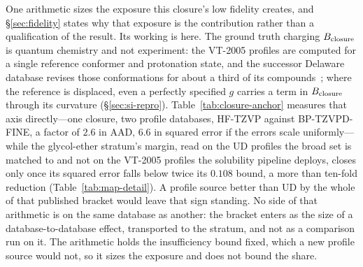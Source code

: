 One arithmetic sizes the exposure this closure's low fidelity creates, and \S\ref{sec:fidelity}
states why that exposure is the contribution rather than a qualification of the result. Its working
is here. The ground truth charging $B_{\mathrm{closure}}$ is
quantum chemistry and not experiment: the VT-2005 profiles are computed for a single reference
conformer and protonation state, and the successor Delaware database revises those conformations for
about a third of its compounds~\cite{fingerhut2017}; where the reference is displaced, even a
perfectly specified $g$ carries a term in $B_{\mathrm{closure}}$ through its curvature (\S\ref{sec:si-repro}).
Table~\ref{tab:closure-anchor} measures that axis directly---one closure, two profile databases,
HF-TZVP against BP-TZVPD-FINE, a
factor of $2.6$ in AAD, $6.6$ in squared error if the errors scale uniformly---while the
glycol-ether stratum's margin, read on the UD profiles the broad set is matched to and not on the
VT-2005 profiles the solubility pipeline deploys, closes only once its squared error falls below
twice its $0.108$ bound,
a more than ten-fold reduction (Table~\ref{tab:map-detail}). A profile source better than UD by
the whole of that published bracket would leave that sign standing. No side of that arithmetic is
on the same database as another: the bracket enters as the size of a database-to-database effect,
transported to the stratum, and not as a comparison run on it. The arithmetic holds the
insufficiency bound fixed, which a new profile source would not, so it sizes the exposure and does
not bound the share.





